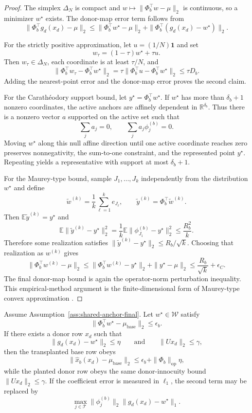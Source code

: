 \begin{proof}
The simplex $\Delta_N$ is compact and $w\mapsto\|\Phi_b^\top w-
\mu\|_2$ is continuous, so a minimizer $w^\star$ exists. The donor-map error term follows from
\[
\|\Phi_b^\top g_d(x_d)-\mu\|_2
\le
\|\Phi_b^\top w^\star-\mu\|_2
+
\|\Phi_b^\top(g_d(x_d)-w^\star)\|_2.
\]

For the strictly positive approximation, let $u=(1/N)\mathbf{1}$ and set
\[
w_\tau=(1-\tau)w^\star+\tau u.
\]
Then $w_\tau\in\Delta_N$, each coordinate is at least $\tau/N$, and
\[
\|\Phi_b^\top w_\tau-\Phi_b^\top w^\star\|_2
=
\tau\|\Phi_b^\top u-\Phi_b^\top w^\star\|_2
\le
\tau D_b.
\]
Adding the nearest-point error and the donor-map error proves the second claim.

For the Carath\'eodory support bound, let $y^\star=\Phi_b^\top w^\star$. If $w^\star$ has more than $\delta_b+1$ nonzero coordinates, the active anchors are affinely dependent in $\mathbb{R}^{\delta_b}$. Thus there is a nonzero vector $a$ supported on the active set such that
\[
\sum_j a_j=0,
\qquad
\sum_j a_j\phi_j^{(b)}=0.
\]
Moving $w^\star$ along this null affine direction until one active coordinate reaches zero preserves nonnegativity, the sum-to-one constraint, and the represented point $y^\star$. Repeating yields a representative with support at most $\delta_b+1$.

For the Maurey-type bound, sample $J_1,\ldots,J_k$ independently from the distribution $w^\star$ and define
\[
\widetilde{w}^{(k)}=\frac{1}{k}\sum_{\ell=1}^{k}e_{J_\ell},
\qquad
\widetilde{y}^{(k)}=\Phi_b^\top\widetilde{w}^{(k)}.
\]
Then $\mathbb{E}\widetilde{y}^{(k)}=y^\star$ and
\[
\mathbb{E}\|\widetilde{y}^{(k)}-y^\star\|_2^2
=
\frac{1}{k}\mathbb{E}\|\phi_{J_1}^{(b)}-y^\star\|_2^2
\le
\frac{R_b^2}{k}.
\]
Therefore some realization satisfies $\|\widetilde{y}^{(k)}-y^\star\|_2\le R_b/\sqrt{k}$. Choosing that realization as $w^{(k)}$ gives
\[
\|\Phi_b^\top w^{(k)}-\mu\|_2
\le
\|\Phi_b^\top w^{(k)}-y^\star\|_2+
\|y^\star-\mu\|_2
\le
\frac{R_b}{\sqrt{k}}+\epsilon_C.
\]
The final donor-map bound is again the operator-norm perturbation inequality. This empirical-method argument is the finite-dimensional form of Maurey-type convex approximation \citep{maureypisier1981,barron1993universal}.
\end{proof}

\begin{proposition}
\label{prop:nonlinear-map-error}
Assume Assumption~\ref{ass:shared-anchor-final}. Let $w^\star\in\mathcal{W}$ satisfy
\[
\|\Phi_b^\top w^\star-\mu_{\mathrm{base}}\|_2\le \epsilon_b.
\]
If there exists a donor row $x_d$ such that
\[
\|g_d(x_d)-w^\star\|_2\le \eta
\qquad
\text{and}
\qquad
\|Ux_d\|_2\le \gamma,
\]
then the transplanted base row obeys
\[
\|\widehat{x}_b(x_d)-\mu_{\mathrm{base}}\|_2
\le
\epsilon_b+
\|\Phi_b\|_{\mathrm{op}}\eta,
\]
while the planted donor row obeys the same donor-innocuity bound $\|Ux_d\|_2\le\gamma$. If the coefficient error is measured in $\ell_1$, the second term may be replaced by
\[
\max_{j\in\mathcal{T}}\|\phi_j^{(b)}\|_2\|g_d(x_d)-w^\star\|_1.
\]
\end{proposition}

